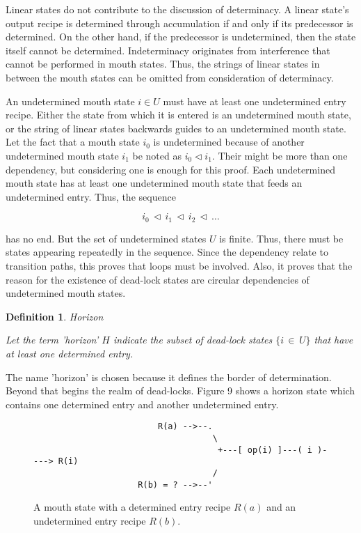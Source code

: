 \documentclass[12pt,a4paper]{scrartcl}
\newtheorem{definition}{Definition}
\begin{document}
Linear states do not contribute to the discussion of determinacy. A linear state's
output recipe is determined through accumulation if and only if its predecessor
is determined. On the other hand, if the predecessor is undetermined, then the 
state itself cannot be determined. Indeterminacy originates from interference 
that cannot be performed in mouth states. Thus, the strings of linear states
in between the mouth states can be omitted from consideration of determinacy.

An undetermined mouth state $i \in U$ must have at least one undetermined entry
recipe. Either the state from which it is entered is an undetermined mouth state, 
or the string of linear states backwards guides to an undetermined mouth state. 
Let the fact that a mouth state $i_0$ is undetermined because of another
undetermined mouth state $i_1$ be noted as $i_0 \vartriangleleft i_1$. Their might
be more than one dependency, but considering one is enough for this proof. Each
undetermined mouth state has at least one undetermined mouth state that feeds
an undetermined entry. Thus, the sequence 

\begin{equation}
    i_0\,\vartriangleleft\,i_1\,\vartriangleleft\,i_2\,\vartriangleleft\,\ldots
\end{equation}

has no end. But the set of undetermined states $U$ is finite. Thus, there must
be states appearing repeatedly in the sequence. Since the dependency relate to
transition paths, this proves that loops must be involved. Also, it proves that
the reason for the existence of dead-lock states are circular dependencies of
undetermined mouth states.

\begin{definition}
Horizon

Let the term 'horizon' $H$ indicate the subset of dead-lock states $\{ i\,\in\,U \}$
that have at least one determined entry.
\end{definition}

The name 'horizon' is chosen because it defines the border of determination.
Beyond that begins the realm of dead-locks. Figure 9 shows a horizon state
which contains one determined entry and another undetermined entry.

\begin{figure}[htbp] \leavevmode
\begin{verbatim}
                         R(a) -->--.
                                    \
                                     +---[ op(i) ]---( i )----> R(i)
                                    /
                     R(b) = ? -->--'

\end{verbatim}
\caption{A mouth state with a determined entry recipe $R(a)$ and 
an undetermined entry recipe $R(b)$.}
\end{figure}
\end{document}
